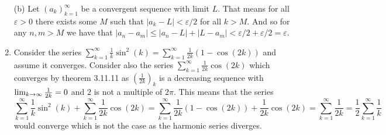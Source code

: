 \documentclass[12pt]{amsart}
\begin{document}
\begin{enumerate}
          \noindent(b) Let ${(a_k)}_{k=1}^{\infty}$ be a convergent sequence with limit $L$. That means for all $\varepsilon>0$ there exists some $M$ such that
          $|a_k-L|<\varepsilon/2$ for all $k>M$. And so for any $n,m>M$ we have that $|a_n-a_m|\leq |a_n-L|+|L-a_m|< \varepsilon/2+\varepsilon/2=\varepsilon$.


    \item Consider the series $\sum_{k=1}^\infty \frac{1}{k}\sin^2(k)=\sum_{k=1}^\infty
              \frac{1}{2k}(1-\cos(2k))$ and assume it converges. Consider also the series
          $\sum_{k=1}^\infty \frac{1}{2k}\cos(2k)$ which converges by theorem 3.11.11 as
          ${\left(\frac{1}{2k}\right)}_k$ is a decreasing sequence with
          $\lim_{k\rightarrow\infty}\frac{1}{2k}=0$ and $2$ is not a multiple of $2\pi$. This
          means that the series
          \[\sum_{k=1}^\infty \frac{1}{k}\sin^2(k)+\sum_{k=1}^\infty \frac{1}{2k}\cos(2k)=\sum_{k=1}^\infty \frac{1}{2k}(1-\cos(2k))+\frac{1}{2k}\cos(2k)
              =\sum_{k=1}^\infty \frac{1}{2k}=\frac{1}{2}\sum_{k=1}^\infty \frac{1}{k}\]
          would converge which is not the case as the harmonic series diverges.
\end{enumerate}
\end{document}
